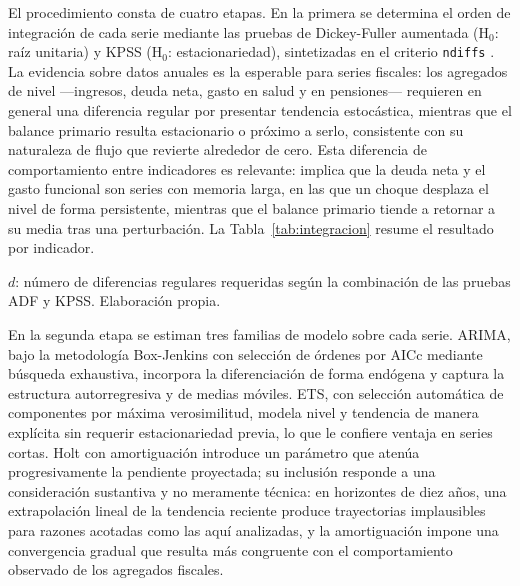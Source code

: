 \documentclass[12pt, letterpaper]{article}
\begin{document}
El procedimiento consta de cuatro etapas. En la primera se determina el orden de integración de cada serie mediante las pruebas de Dickey-Fuller aumentada
(H$_0$: raíz unitaria) y KPSS (H$_0$: estacionariedad), sintetizadas en el criterio
\texttt{ndiffs} \citep{hyndman2021}. La evidencia sobre datos anuales es la esperable para series fiscales: los agregados de nivel —ingresos, deuda neta, gasto en
salud y en pensiones— requieren en general una diferencia regular por presentar tendencia estocástica, mientras que el balance primario resulta estacionario o próximo
a serlo, consistente con su naturaleza de flujo que revierte alrededor de cero. Esta
diferencia de comportamiento entre indicadores es relevante: implica que la deuda neta
y el gasto funcional son series con memoria larga, en las que un choque desplaza el
nivel de forma persistente, mientras que el balance primario tiende a retornar a su
media tras una perturbación. La Tabla~\ref{tab:integracion} resume el resultado por
indicador.

\begin{table}[htbp]
  \centering
  \caption{Orden de integración sugerido (\texttt{ndiffs}): número de países por
  indicador.}
  \label{tab:integracion}
  

  \vspace{2pt}
  \footnotesize
  $d$: número de diferencias regulares requeridas según la combinación de las
  pruebas ADF y KPSS. Elaboración propia.
\end{table}

En la segunda etapa se estiman tres familias de modelo sobre cada serie. ARIMA, bajo
la metodología Box-Jenkins con selección de órdenes por AICc mediante búsqueda
exhaustiva, incorpora la diferenciación de forma endógena y captura la estructura
autorregresiva y de medias móviles. ETS, con selección automática de componentes por
máxima verosimilitud, modela nivel y tendencia de manera explícita sin requerir
estacionariedad previa, lo que le confiere ventaja en series cortas. Holt con
amortiguación introduce un parámetro que atenúa progresivamente la pendiente
proyectada; su inclusión responde a una consideración sustantiva y no meramente
técnica: en horizontes de diez años, una extrapolación lineal de la tendencia reciente
produce trayectorias implausibles para razones acotadas como las aquí analizadas, y la
amortiguación impone una convergencia gradual que resulta más congruente con el
comportamiento observado de los agregados fiscales.
\end{document}
